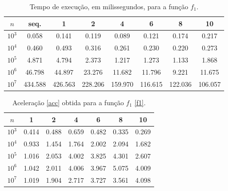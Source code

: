\documentclass{article}
\begin{document}
  \begin{table}[h!]
    \centering
    \begin{tabular}{||c c c c c c c c||}
      \hline
      $n$ & seq. & 1 & 2 & 4 & 6 & 8 & 10 \\ 
      \hline \hline
      $10^{3}$ & 0.058 & 0.141 & 0.119 & 0.089 & 0.121 & 0.174 & 0.217 \\ 
      \hline 
      $10^{4}$ & 0.460 & 0.493 & 0.316 & 0.261 & 0.230 & 0.220 & 0.273 \\ 
      \hline 
      $10^{5}$ & 4.871 & 4.794 & 2.373 & 1.217 & 1.273 & 1.133 & 1.868 \\ 
      \hline 
      $10^{6}$ & 46.798 & 44.897 & 23.276 & 11.682 & 11.796 & 9.221 & 11.675 \\ 
      \hline 
      $10^{7}$ & 434.588 & 426.563 & 228.206 & 159.970 & 116.615 & 122.036 & 106.057 \\ 
      \hline 
    \end{tabular}
    \caption{Tempo de execução, em milissegundos, para a função $f_1$.}
    \label{f1t}
  \end{table}

    \begin{table}[h!]
      \centering
      \begin{tabular}{||c c c c c c c||}
        \hline
        $n$ & 1 & 2 & 4 & 6 & 8 & 10 \\ 
        \hline \hline
        $10^{3}$ & 0.414 & 0.488 & 0.659 & 0.482 & 0.335 & 0.269 \\ 
        \hline 
        $10^{4}$ & 0.933 & 1.454 & 1.764 & 2.002 & 2.094 & 1.682 \\ 
        \hline 
        $10^{5}$ & 1.016 & 2.053 & 4.002 & 3.825 & 4.301 & 2.607 \\ 
        \hline 
        $10^{6}$ & 1.042 & 2.011 & 4.006 & 3.967 & 5.075 & 4.009 \\ 
        \hline 
        $10^{7}$ & 1.019 & 1.904 & 2.717 & 3.727 & 3.561 & 4.098 \\ 
        \hline 
      \end{tabular}
      \caption{Aceleração \eqref{acc} obtida para a função $f_1$ \eqref{f1}. }
      \label{f1a}
    \end{table}
\end{document}

